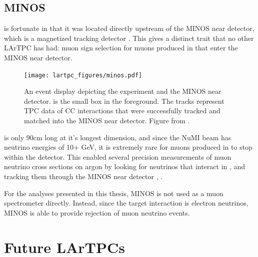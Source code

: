 \subsection{MINOS}

\argoneut is fortunate in that it was located directly upstream of the MINOS near detector, which is a magnetized tracking detector \cite{MINOS}.  This gives \argoneut a distinct trait that no other LArTPC has had: muon sign selection for muons produced in \argoneut that enter the MINOS near detector.

\begin{figure}[h]
  \centering
  \texttt{[image: lartpc\_figures/minos.pdf]}
  \caption{An event display depicting the \argoneut experiment and the MINOS near detector. \argoneut is the small box in the foreground.  The tracks represent TPC data of \numu CC interactions that were successfully tracked and matched into the MINOS near detector.  Figure from \cite{Anderson:2012vc}.}
  \label{fig:signal_shaping}
\end{figure}

\argoneut is only 90cm long at it's longest dimension, and since the NuMI beam has neutrino energies of 10+ GeV, it is extremely rare for muons produced in \argoneut to stop within the detector.  This enabled several precision measurements of muon neutrino cross sections on argon by looking for neutrinos that interact in \argoneut, and tracking them through the MINOS near detector \cite{Anderson:2011ce}, \cite{Acciarri:2014isz}.

For the analyses presented in this thesis, MINOS is not used as a muon spectrometer directly.  Instead, since the target interaction is electron neutrinos, MINOS is able to provide rejection of muon neutrino events.

\section{\label{sec:microboone} \uboone}

\section{\label{sec:future_tpcs} Future LArTPCs}









